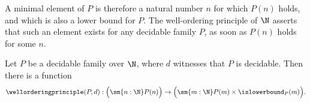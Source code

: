   A minimal element of $P$ is therefore a natural number $n$ for which $P(n)$ holds, and which is also a lower bound for $P$. The well-ordering principle of $\N$ asserts that such an element exists for any decidable family $P$, as soon as $P(n)$ holds for some $n$.

  \begin{thm}\label{thm:well-ordering-principle-N}
    Let $P$ be a decidable family over $\N$, where $d$ witnesses that $P$ is decidable. Then there is a function
  \begin{equation*}
    \wellorderingprinciple(P,d):\Big(\sm{n:\N}P(n)\Big)\to\Big(\sm{m:\N}P(m)\times\islowerbound_P(m)\Big).
  \end{equation*}
\end{thm}

